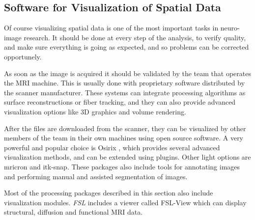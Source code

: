 \subsection{Software for Visualization of Spatial Data}

Of course visualizing spatial data is one of the most important tasks in neuro-image research. It should be done at every step of the analysis, to verify quality, and make sure everything is going as expected, and so problems can be corrected opportunely.

As soon as the image is acquired it should be validated by the team that operates the MRI machine. This is usually done with proprietary software distributed by the scanner manufacturer. These systems can integrate processing algorithms as surface reconstructions or fiber tracking, and they can also provide advanced visualization options like 3D graphics and volume rendering.


After the files are downloaded from the scanner, they can be visualized by other members of the team in their own machines using open source software. A very powerful and popular choice is Osirix \autocite{rosset_osirix:_2004}, which provides several advanced visualization methods, and can be extended using plugins. Other light options are mricron and itk-snap. These packages also include tools for annotating images and performing manual and assisted segmentation of images.


Most of the processing packages described in this section also include visualization modules. \emph{FSL} includes a viewer called FSL-View which can display structural, diffusion and functional MRI data. 


